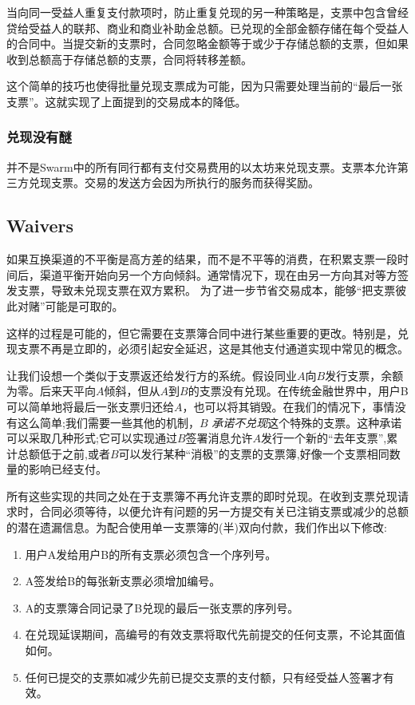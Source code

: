 当向同一受益人重复支付款项时，防止重复兑现的另一种策略是，支票中包含曾经贷给受益人的联邦、商业和商业补助金总额。已兑现的全部金额存储在每个受益人的合同中。当提交新的支票时，合同忽略金额等于或少于存储总额的支票，但如果收到总额高于存储总额的支票，合同将转移差额。


这个简单的技巧也使得批量兑现支票成为可能，因为只需要处理当前的“最后一张支票”。这就实现了上面提到的交易成本的降低。

\subsubsection{兑现没有醚}\label{sec:zero_eth}
并不是Swarm中的所有同行都有支付交易费用的以太坊来兑现支票。支票本允许第三方兑现支票。交易的发送方会因为所执行的服务而获得奖励。

\subsection{Waivers\statusgreen}\label{sec:waiver}

如果互换渠道的不平衡是高方差的结果，而不是不平等的消费，在积累支票一段时间后，渠道平衡开始向另一个方向倾斜。通常情况下，现在由另一方向其对等方签发支票，导致未兑现支票在双方累积。
为了进一步节省交易成本，能够“把支票彼此对赌”可能是可取的。

这样的过程是可能的，但它需要在支票簿合同中进行某些重要的更改。特别是，兑现支票不再是立即的，必须引起安全延迟，这是其他支付通道实现中常见的概念。 

让我们设想一个类似于支票返还给发行方的系统。假设同业$A$向$B$发行支票，余额为零。后来天平向$A$倾斜，但从$A$到$B$的支票没有兑现。在传统金融世界中，用户B可以简单地将最后一张支票归还给$A$，也可以将其销毁。在我们的情况下，事情没有这么简单;我们需要一些其他的机制，$B$ \emph{承诺不兑现}这个特殊的支票。这种承诺可以采取几种形式;它可以实现通过$B$签署消息允许$A$发行一个新的“去年支票”,累计总额低于之前,或者$B$可以发行某种“消极”的支票的支票簿,好像一个支票相同数量的影响已经支付。 

所有这些实现的共同之处在于支票簿不再允许支票的即时兑现。在收到支票兑现请求时，合同必须等待，以便允许有问题的另一方提交有关已注销支票或减少的总额的潜在遗漏信息。为配合使用单一支票簿的(半)双向付款，我们作出以下修改:

\begin{enumerate}
    \item 用户A发给用户B的所有支票必须包含一个序列号。
    \item A签发给B的每张新支票必须增加编号。
    \item A的支票簿合同记录了B兑现的最后一张支票的序列号。
    \item 在兑现延误期间，高编号的有效支票将取代先前提交的任何支票，不论其面值如何。
    \item 任何已提交的支票如减少先前已提交支票的支付额，只有经受益人签署才有效。
\end{enumerate}


